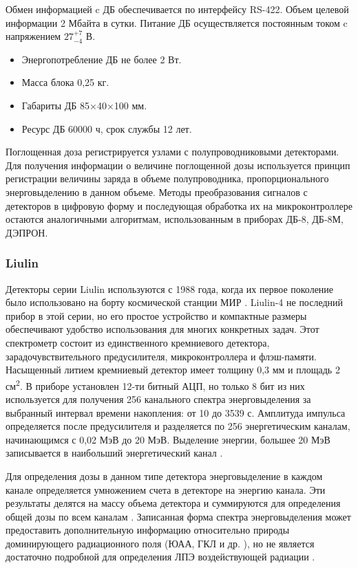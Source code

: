 Обмен информацией c ДБ обеспечивается по интерфейсу RS-422. Объем целевой информации 2 Мбайта в сутки. Питание ДБ осуществляется постоянным током c напряжением $ 27^{+7}_{-4} $ В. 

\begin{itemize}
\item Энергопотребление ДБ не более 2 Вт.
\item Масса блока 0,25 кг.
\item Габариты ДБ 85×40×100 мм. 
\item Ресурс ДБ  60000 ч, срок службы 12 лет.
\end{itemize}


Поглощенная доза регистрируется узлами с полупроводниковыми детекторами. Для получения информации о величине поглощенной дозы используется принцип регистрации величины заряда в объеме полупроводника, пропорционального энерговыделению в данном объеме. Методы преобразования сигналов с детекторов в цифровую форму и последующая обработка их на микроконтроллере остаются аналогичными алгоритмам, использованным в приборах ДБ-8, ДБ-8М, ДЭПРОН.  


\subsubsection{Liulin}

Детекторы серии Liulin используются с 1988 года, когда их первое поколение было использовано на борту космической станции МИР \cite{Caffrey2011}. Liulin-4 не последний прибор в этой серии, но его простое устройство и компактные размеры обеспечивают удобство использования для многих конкретных задач. Этот спектрометр состоит из единственного кремниевого детектора, зарадочувствительного предусилителя, микроконтроллера и флэш-памяти. Насыщенный литием кремниевый детектор имеет толщину 0,3 мм и площадь 2 см\textsuperscript{2}. В приборе установлен 12-ти битный АЦП, но только 8 бит из них используется для получения 256 канального спектра энерговыделения за выбранный интервал времени накопления: от 10 до 3539 с. Амплитуда импульса определяется после предусилителя и разделяется по 256 энергетическим каналам, начинающимся с 0,02 МэВ до 20 МэВ. Выделение энергии, большее 20 МэВ записывается в наибольший энергетический канал \cite{Dachev2002} .


Для определения дозы в данном типе детектора энерговыделение в каждом канале определяется умножением счета в детекторе на энергию канала. Эти результаты делятся на массу объема детектора и суммируются для определения общей дозы по всем каналам \cite{Dachev2002}. Записанная форма спектра энерговыделения может предоставить дополнительную информацию относительно природы доминирующего радиационного поля (ЮАА, ГКЛ и др. ), но не является достаточно подробной для определения ЛПЭ воздействующей радиации \cite{Caffrey2011}. 


